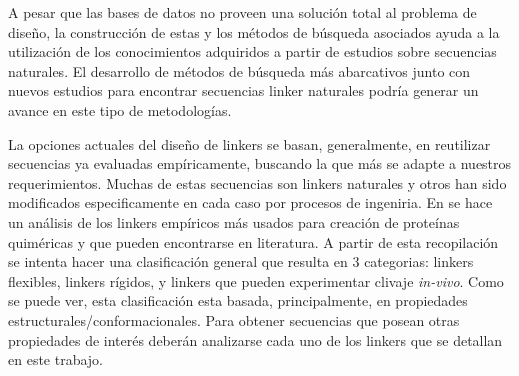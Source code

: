 A pesar que las bases de datos no proveen una solución total al problema de diseño, la construcción de estas y los métodos de búsqueda asociados 
ayuda a la utilización de los conocimientos adquiridos a partir de estudios sobre secuencias naturales.
El desarrollo de métodos de búsqueda más abarcativos junto con nuevos estudios para encontrar secuencias linker naturales podría generar un avance en este tipo de metodologías.




La opciones actuales del diseño de linkers se basan, generalmente,  en reutilizar secuencias ya evaluadas empíricamente, buscando la que más se adapte a nuestros requerimientos. 
Muchas de estas secuencias son linkers naturales y otros han sido modificados especificamente en cada caso por procesos de ingeniria.
En \cite{chen2013fusion} se hace un análisis de los linkers empíricos más usados para creación de proteínas quiméricas y que pueden encontrarse en literatura.
A partir de esta recopilación se intenta hacer una clasificación general que resulta en 3 categorias:
linkers flexibles, linkers rígidos, y linkers que pueden experimentar clivaje \textit{in-vivo}. 
Como se puede ver, esta clasificación esta basada, principalmente, en propiedades estructurales/conformacionales. 
Para obtener secuencias que posean otras propiedades de interés deberán analizarse cada uno de los linkers que se detallan en este trabajo.



